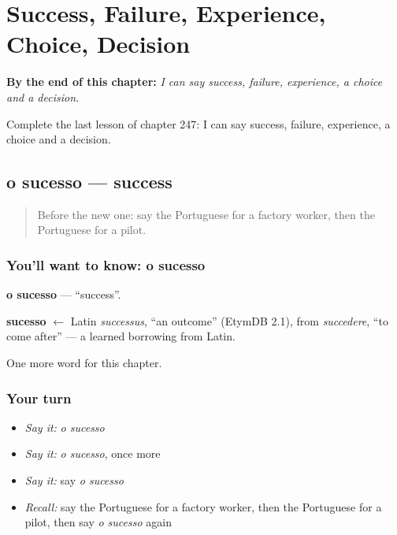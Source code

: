 
\chapter{Success, Failure, Experience, Choice, Decision}
\label{ch:pt-success-failure-experience-choice-decision}

\begin{chapteropening}
\textbf{By the end of this chapter:} \emph{I can say success, failure, experience, a choice and a decision.}

Complete the last lesson of chapter 247: I can say success, failure, experience, a choice and a decision.
\end{chapteropening}

\section[o sucesso]{o sucesso — success}

\label{lesson:PT-C247-sucesso}



\begin{quote}
Before the new one: say the Portuguese for a factory worker, then the Portuguese for a pilot.
\end{quote}

\subsection*{You'll want to know: o sucesso}
\textbf{o sucesso} — \textquotedblleft{}success\textquotedblright{}.

\begin{cousinweb}
\textbf{sucesso} $\leftarrow$ Latin \emph{successus}, \textquotedblleft{}an outcome\textquotedblright{} (EtymDB 2.1), from \emph{succedere}, \textquotedblleft{}to come after\textquotedblright{} — a learned borrowing from Latin.
\end{cousinweb}

\begin{grammarlens}[title={What you've built}]
One more word for this chapter.
\end{grammarlens}

\subsection*{Your turn}
\begin{itemize}
\raggedright
  \item \emph{Say it:} \emph{o sucesso}
  \item \emph{Say it:} \emph{o sucesso}, once more
  \item \emph{Say it:} say \emph{o sucesso}
  \item \emph{Recall:} say the Portuguese for a factory worker, then the Portuguese for a pilot, then say \emph{o sucesso} again
\end{itemize}

